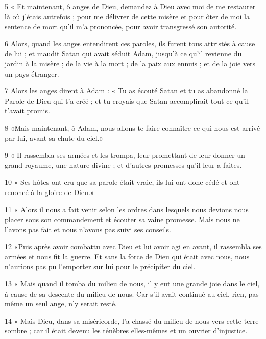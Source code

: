 \par 5 « Et maintenant, ô anges de Dieu, demandez à Dieu avec moi de me restaurer là où j'étais autrefois ; pour me délivrer de cette misère et pour ôter de moi la sentence de mort qu'il m'a prononcée, pour avoir transgressé son autorité.

\par 6 Alors, quand les anges entendirent ces paroles, ils furent tous attristés à cause de lui ; et maudit Satan qui avait séduit Adam, jusqu'à ce qu'il revienne du jardin à la misère ; de la vie à la mort ; de la paix aux ennuis ; et de la joie vers un pays étranger.

\par 7 Alors les anges dirent à Adam : « Tu as écouté Satan et tu as abandonné la Parole de Dieu qui t'a créé ; et tu croyais que Satan accomplirait tout ce qu'il t'avait promis.

\par 8 «Mais maintenant, ô Adam, nous allons te faire connaître ce qui nous est arrivé par lui, avant sa chute du ciel.»

\par 9 « Il rassembla ses armées et les trompa, leur promettant de leur donner un grand royaume, une nature divine ; et d'autres promesses qu'il leur a faites.

\par 10 « Ses hôtes ont cru que sa parole était vraie, ils lui ont donc cédé et ont renoncé à la gloire de Dieu.»

\par 11 « Alors il nous a fait venir selon les ordres dans lesquels nous devions nous placer sous son commandement et écouter sa vaine promesse. Mais nous ne l’avons pas fait et nous n’avons pas suivi ses conseils.

\par 12 «Puis après avoir combattu avec Dieu et lui avoir agi en avant, il rassembla ses armées et nous fit la guerre. Et sans la force de Dieu qui était avec nous, nous n’aurions pas pu l’emporter sur lui pour le précipiter du ciel.

\par 13 « Mais quand il tomba du milieu de nous, il y eut une grande joie dans le ciel, à cause de sa descente du milieu de nous. Car s’il avait continué au ciel, rien, pas même un seul ange, n’y serait resté.

\par 14 « Mais Dieu, dans sa miséricorde, l'a chassé du milieu de nous vers cette terre sombre ; car il était devenu les ténèbres elles-mêmes et un ouvrier d’injustice.

